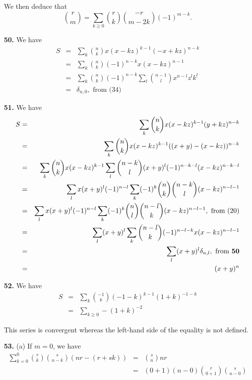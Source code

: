 \documentclass[a4paper,12pt]{article}
\newcommand{\newpar}[1]{\bigskip \noindent \textbf{#1.}}
\newcommand{\subpar}[1]{\medskip \noindent (#1)}
\begin{document}
We then deduce that
\[  {r \choose m} =  \sum_{k \ge 0} {r \choose k}{-r \choose
  m-2k}(-1)^{m-k} .\]

\newpar{50} We have
\begin{eqnarray*}
  S &=&  \sum_k {n \choose k} x(x-kz)^{k-1}(-x + kz)^{n-k} \\
  &=& \sum_k {n
    \choose k} (-1)^{n-k} x (x - kz)^{n-1} \\
  &=& \sum_k {n \choose k} (-1)^{n-k} \sum_l {n-1 \choose l}
  x^{n-l}z^l k^l \\
  &=& \delta_{n,0}, \mbox{ from (34)}
\end{eqnarray*}

\newpar{51} We have
\begin{eqnarray*}
 S &=&  \sum_k {n \choose k} x (x-kz)^{k-1}(y+kz)^{n-k} \\
 &=&  \sum_k {n \choose k} x (x-kz)^{k-1}((x+y) - (x-kz))^{n-k} \\
 &=& \sum_k {n \choose k} x(x-kz)^{k-1} \sum_l {n-k \choose l} (x+y)^l
 (-1)^{n-k-l}(x-kz)^{n-k-l} \\
 &=& \sum_l x (x+y)^l (-1)^{n-l} \sum_k (-1)^k {n \choose k}{n - k
   \choose l}(x - kz)^{n-l-1} \\
 &=& \sum_l x (x+y)^l (-1)^{n-l} \sum_k (-1)^k {n \choose l}{n-l
   \choose k} (x-kz)^{n-l-1}, \mbox{ from (20)} \\
 &=& \sum_l (x+y)^l \sum_k {n-l \choose k}(-1)^{n-l-k} x(x -
 kz)^{n-l-1} \\
 &=& \sum_l (x+y)^l \delta_{n,l}, \mbox{ from \textbf{50}} \\
 &=& (x+y)^n
\end{eqnarray*}

\newpar{52} We have
\begin{eqnarray*}
  S &=& \sum_k {-1 \choose k}(-1-k)^{k-1}(1+k)^{-1-k} \\
  &=& \sum_{k\ge 0} - (1+k)^{-2}
\end{eqnarray*}

This series is convergent whereas the left-hand side of the equality
is not defined.

\newpar{53} \subpar{a} If $m=0$, we have
\begin{eqnarray*}
  \sum_{k=0}^0 {r \choose k} {s \choose n-k} (nr-(r+sk)) &=& {s
    \choose n}nr \\
  &=& (0+1)(n-0) {r \choose 0+1}{s \choose n-0}
\end{eqnarray*}
\end{document}
